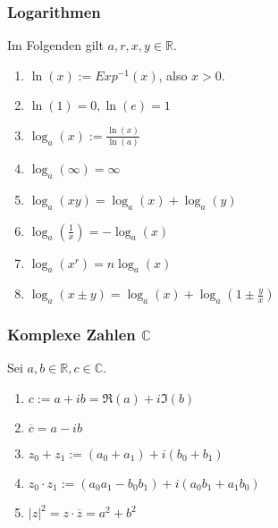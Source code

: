 \documentclass[a4paper, 9pt, DIV=24]{scrartcl}
\begin{document}
\subsubsection{Logarithmen} Im Folgenden gilt $a,r,x,y \in\mathbb{R}$.
\begin{enumerate}[label={(}\arabic*{)}]
 \item $\ln(x) := Exp^{-1}(x)$, also $x > 0$.
 \item $\ln(1) = 0, \ln(e) = 1$
 \item $\log_a(x) := \frac{\ln(x)}{\ln(a)}$
 \item $\log_a(\infty) = \infty$
 \item $\log_a(xy) = \log_a(x)+\log_a(y)$
 \item $\log_a(\frac{1}{x}) = -\log_a(x)$
 \item $\log_a(x^r) = n\log_a(x)$
 \item $\log_a(x \pm y) = \log_a(x) + \log_a(1 \pm \frac{y}{x})$
\end{enumerate}

\subsubsection{Komplexe Zahlen $\mathbb{C}$}
Sei $a,b \in \mathbb{R}, c \in \mathbb{C}$.
\begin{enumerate}[label={(}\arabic*{)}]
 \item $c := a + ib = \Re(a) + i\Im(b)$
 \item $\overline{c} = a - ib$
 \item $z_0 + z_1 := (a_0 + a_1) + i(b_0 + b_1)$
 \item $z_0 \cdot z_1 := (a_0a_1 - b_0b_1) + i(a_0b_1 + a_1b_0)$
 \item $|z|^2 = z\cdot\overline{z} = a^2 + b^2$
\end{enumerate}
\end{document}
